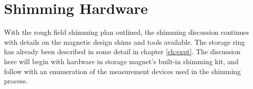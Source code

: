 \section{Shimming Hardware}

With the rough field shimming plan outlined, the shimming discussion continues with details on the magnetic design shims and tools available.  The storage ring has already been described in some detail in chapter \ref{ch:expt}.  The discussion here will begin with hardware in storage magnet's built-in shimming kit, and follow with an enumeration of the measurement devices used in the shimming process.





